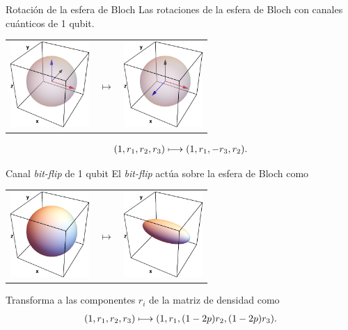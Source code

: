 \documentclass[xcolor=dvipsnames,presentation]{beamer}%
\begin{document}
\begin{frame}{Rotación de la esfera de Bloch}
	Las rotaciones de la esfera de Bloch con canales cuánticos de 1 qubit.
	\begin{center}
	\begin{tabular}{m{2.5cm} m{1.5cm} m{2.5cm}}
		\includegraphics[width=3cm]{rotation_01}
		& \hfill \LARGE{$\longmapsto$} \hfill
		& \includegraphics[width=3cm]{rotation_02}
	\end{tabular}
	\end{center}
	
	\begin{align*}
	\qty(1,r_1,r_2,r_3) \longmapsto \qty(1,r_1,-r_3,r_2).
	\end{align*}
\end{frame}

\begin{frame}{Canal \textit{bit-flip} de 1 qubit}
	El \textit{bit-flip} actúa sobre la esfera de Bloch como
	\begin{center}
	\begin{tabular}{m{2.5cm} m{1.5cm} m{2.5cm}}
		\includegraphics[width=3cm]{unit_sph}
		& \hfill \LARGE{$\longmapsto$} \hfill
		& \includegraphics[width=3cm]{bit_flip_p0_3}
	\end{tabular}
	\end{center}
	
	Transforma a las componentes $r_i$ de la matriz de densidad como
	\begin{align*}
	\qty(1,r_1,r_2,r_3) \longmapsto \qty(1,r_1,\qty(1-2p)r_2,\qty(1-2p)r_3).
	\end{align*}
\end{frame}
\end{document}
